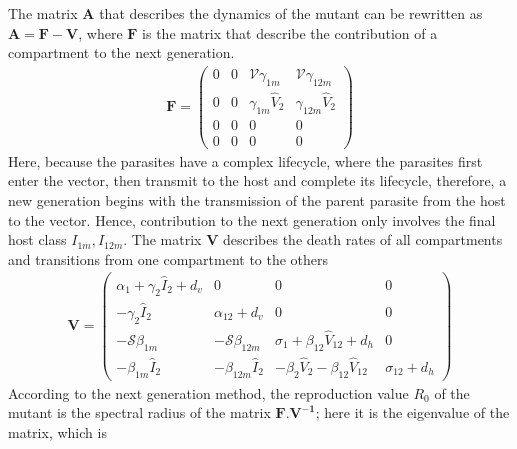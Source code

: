 \documentclass{article}
\begin{document}
The matrix $\textbf{A}$ that describes the dynamics of the mutant can be rewritten as $\textbf{A} = \textbf{F} - \textbf{V}$, where $\textbf{F}$ is the matrix that describe the contribution of a compartment to the next generation. \begin{align*}
    \mathbf{F} = 
    \begin{pmatrix}
    0 & 0 & \mathcal{V} \gamma_{1m} & \mathcal{V} \gamma_{12m} \\
    0 & 0 & \gamma_{1m} \hat{V}_2 & \gamma_{12m} \hat{V}_2 \\
    0 & 0 & 0 & 0 \\
    0 & 0 & 0 & 0
    \end{pmatrix}
\end{align*}
Here, because the parasites have a complex lifecycle, where the parasites first enter the vector, then transmit to the host and complete its lifecycle, therefore, a new generation begins with the transmission of the parent parasite from the host to the vector. Hence, contribution to the next generation only involves the final host class $I_{1m}, I_{12m}$. The matrix $\mathbf{V}$ describes the death rates of all compartments and transitions from one compartment to the others
\begin{align*}
    \mathbf{V} = 
    \begin{pmatrix}
     \alpha_1 + \gamma_2 \hat{I}_2 + d_v & 0 & 0 & 0 \\
     -\gamma_2 \hat{I}_2 &  \alpha_{12} + d_v &  0 &  0 \\ -\mathcal{S} \beta_{1m} & -\mathcal{S} \beta_{12m} & \sigma_1 + \beta_{12} \hat{V}_{12} + d_h &   0 \\ -\beta_{1m} \hat{I}_2 & -\beta_{12m} \hat{I}_2 & -\beta_2 \hat{V}_2 - \beta_{12} \hat{V}_{12} & \sigma_{12} + d_h
    \end{pmatrix}
\end{align*}
According to the next generation method, the reproduction value $R_0$ of the mutant is the spectral radius of the matrix $\mathbf{F.V^{-1}}$; here it is the eigenvalue of the matrix, which is
\end{document}
